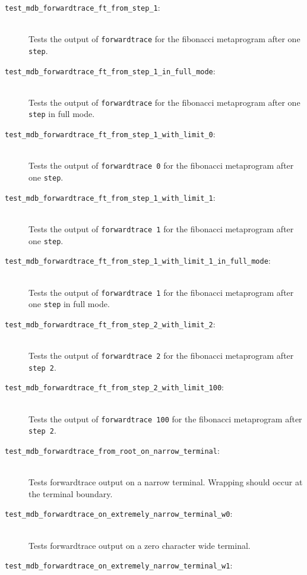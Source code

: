 \begin{description}
    \item[\texttt{test\_mdb\_forwardtrace\_ft\_from\_step\_1}:] \hfill \\
        Tests the output of \texttt{forwardtrace} for the fibonacci metaprogram
        after one \texttt{step}.
    \item[\texttt{test\_mdb\_forwardtrace\_ft\_from\_step\_1\_in\_full\_mode}:] \hfill \\
        Tests the output of \texttt{forwardtrace} for the fibonacci metaprogram
        after one \texttt{step} in full mode.
    \item[\texttt{test\_mdb\_forwardtrace\_ft\_from\_step\_1\_with\_limit\_0}:] \hfill \\
        Tests the output of \texttt{forwardtrace 0} for the fibonacci
        metaprogram after one \texttt{step}.
    \item[\texttt{test\_mdb\_forwardtrace\_ft\_from\_step\_1\_with\_limit\_1}:] \hfill \\
        Tests the output of \texttt{forwardtrace 1} for the fibonacci
        metaprogram after one \texttt{step}.
    \item[\texttt{test\_mdb\_forwardtrace\_ft\_from\_step\_1\_with\_limit\_1\_in\_full\_mode}:] \hfill \\
        Tests the output of \texttt{forwardtrace 1} for the fibonacci
        metaprogram after one \texttt{step} in full mode.
    \item[\texttt{test\_mdb\_forwardtrace\_ft\_from\_step\_2\_with\_limit\_2}:] \hfill \\
        Tests the output of \texttt{forwardtrace 2} for the fibonacci
        metaprogram after \texttt{step 2}.
    \item[\texttt{test\_mdb\_forwardtrace\_ft\_from\_step\_2\_with\_limit\_100}:] \hfill \\
        Tests the output of \texttt{forwardtrace 100} for the fibonacci
        metaprogram after \texttt{step 2}.
    \item[\texttt{test\_mdb\_forwardtrace\_from\_root\_on\_narrow\_terminal}:] \hfill \\
        Tests forwardtrace output on a narrow terminal. Wrapping should occur
        at the terminal boundary.
    \item[\texttt{test\_mdb\_forwardtrace\_on\_extremely\_narrow\_terminal\_w0}:] \hfill \\
        Tests forwardtrace output on a zero character wide terminal.
    \item[\texttt{test\_mdb\_forwardtrace\_on\_extremely\_narrow\_terminal\_w1}:] \hfill \\

\end{description}
